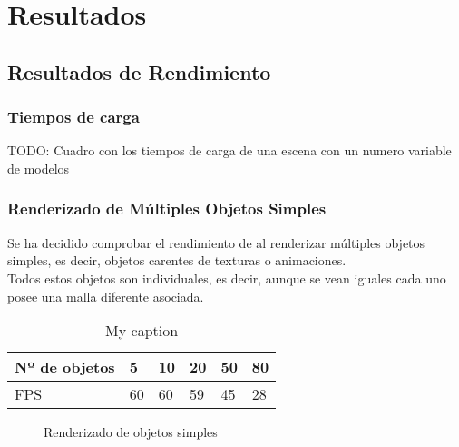 
\chapter{Resultados} %

\label{Chapter4} %


\section{Resultados de Rendimiento}

\subsection{Tiempos de carga}
TODO: Cuadro con los tiempos de carga de una escena con un numero variable de modelos
\subsection{Renderizado de Múltiples Objetos Simples}
Se ha decidido comprobar el rendimiento de \robotto al renderizar múltiples objetos simples, es decir, objetos carentes de texturas o animaciones.\\
Todos estos objetos son individuales, es decir, aunque se vean iguales cada uno posee una malla diferente asociada.\\

\begin{table}[h]
\centering
\caption{My caption}
\label{my-label}
\begin{tabular}{|l|l|l|l|l|l|}
\hline
Nº de objetos & 5  & 10 & 20 & 50 & 80 \\ \hline
FPS           & 60 & 60 & 59 & 45 & 28 \\ \hline
\end{tabular}
\end{table}

\begin{figure}[h!]
\centering
{}
\hspace{0mm}
\hspace{0mm}
\caption[Renderizado de objetos simples]{Renderizado de objetos simples}
\label{fig:benchmarksimple}
\end{figure}


